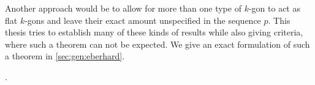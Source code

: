 Another approach would be to allow for more than one type of $k$-gon to act as flat $k$-gons and leave their exact amount unspecified in the sequence $p$. This thesis tries to establish many of these kinds of results while also giving criteria, where such a theorem can not be expected. We give an exact formulation of such a theorem in \autoref{sec:gen:eberhard}.


.